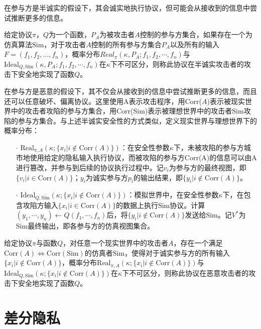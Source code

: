 在参与方是半诚实的假设下，其会诚实地执行协议，但可能会从接收到的信息中尝试推断更多的信息。

\begin{definition}{}
	给定协议$\pi$，$Q$为一个函数，$P_A$为被攻击者$A$控制的参与方集合，如果存在一个为仿真算法$\text{Sim}$，对于攻击者$A$控制的所有参与方集合$P_A$以及所有的输入$F=(f_1, f_2, \dots, f_n)$，概率分布$Real_\pi(\kappa,P_A;f_1,f_2,\cdots,f_n)$与$\text{Ideal}_{Q,\text{Sim}}(\kappa,P_A;f_1,f_2,\cdots,f_n)$在$\kappa$下不可区分，则称此协议在半诚实攻击者的攻击下安全地实现了函数$Q$。
\end{definition}

在参与方是恶意的假设下，其不仅会从接收到的信息中尝试推断更多的信息，而且还可以任意破坏、偏离协议。这里使用A表示攻击程序，用Corr($A$)表示被现实世界中的攻击者攻陷的参与方集合，用Corr(Sim)表示被理想世界中的攻击者Sim攻陷的参与方集合。与上述半诚实安全性的方式类似，定义现实世界与理想世界下的概率分布：
\begin{itemize}
	\item [$\cdot$]
	$\text{Real}_{\pi,A}(\kappa;\{x_i|i\notin \text{Corr}(A)\})$：在安全性参数$\kappa$下，未被攻陷的参与方城市地使用给定的隐私输入执行协议，而被攻陷的参与方Corr(A)的信息可以由A进行篡改，并参与到后续的协议执行过程中。记$v_i$为参与方的最终视图，即$\{v_i|i\in \text{Corr}(A)\}$；$y_i$为诚实参与方$p_i$的输出结果，即$\{y_i|i\notin \text{Corr}(A)\}$。
	\item [$\cdot$]
	$\text{Ideal}_{Q,\text{Sim}}(\kappa;\{x_i|i\notin \text{Corr}(A)\})$：模拟世界中，在安全性参数$\kappa$下，在包含攻陷方输入$\{x_i|i\in \text{Corr}(A)\}$的数据上执行$\text{Sim}$协议。计算$(y_1,\cdots,y_n)\leftarrow Q(f_1,\cdots,f_n)$后，将$\{y_i|i\notin \text{Corr}(A)\}$发送给$\text{Sim}$。记$V^*$为$\text{Sim}$最终输出，即各参与方的仿真视图集合。
\end{itemize}

\begin{definition}{}
	给定协议$\pi$与函数$Q$，对任意一个现实世界中的攻击者$A$，存在一个满足$\text{Corr}(A)\Longleftrightarrow \text{Corr}(\text{Sim})$的仿真者$\text{Sim}$，使得对于诚实参与方的所有输入$\{x_i|i\notin \text{Corr}(A)\}$，概率分布$\text{Real}_{\pi,A}(\kappa;\{x_i|i\notin \text{Corr}(A)\})$与$\text{Ideal}_{Q,\text{Sim}}(\kappa;\{x_i|i\notin \text{Corr}(A)\})$在$\kappa$下不可区分，则称此协议在恶意攻击者的攻击下安全地实现了函数$Q$。
\end{definition}

\section{差分隐私}

